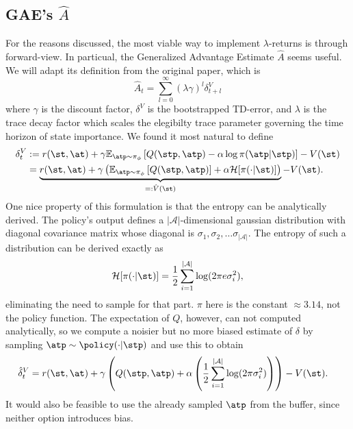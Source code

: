 \subsection{GAE's \(\hat{A}\)}
For the reasons discussed, the most viable way to implement \(\lambda\)-returns is through forward-view. In particual, the Generalized Advantage Estimate \(\hat{A}\) seems useful. We will adapt its definition from the original paper, which is
\begin{equation}
    \hat{A}_t = \sum_{l=0}^\infty {(\lambda\gamma)^l \delta_{t+l}^V}
\end{equation}
where $\gamma$ is the discount factor, $\delta^V$ is the bootstrapped TD-error, and $\lambda$ is the trace decay factor which scales the elegibilty trace parameter governing the time horizon of state importance. We found it most natural to define
\begin{align}
    \label{eq:delta_V}
    \delta_t^V &:=  r(\st, \at) + \gamma\mathbb{E}_{\atp \sim \pi_\phi} \left[Q(\stp,\atp) - \alpha \log{\pi(\atp|\stp)}\right]- V(\st) \notag\\
    &= \underbrace{r(\st, \at) + \gamma\left(
        \mathbb{E}_{\atp \sim \pi_\phi}\left[Q(\stp,\atp)\right] + \alpha \mathcal{H}[\pi(\cdot | \st)]
    \right)}_{=: \hat{V}(\st)} - V(\st).
\end{align}
One nice property of this formulation is that the entropy can be analytically derived. The policy's output defines a \(|\mathcal{A}|\)-dimensional gaussian distribution with diagonal covariance matrix whose diagonal is \(\sigma_1, \sigma_2, \ldots \sigma_{|\mathcal{A}|}\). The entropy of such a distribution can be derived exactly as
\begin{align}
    \mathcal{H}[\pi(\cdot | \st)] = \frac{1}{2} \sum_{i=1}^{|\mathcal{A}|}\log(2 \pi e \sigma_i^2), \label{eq:H}
\end{align}
eliminating the need to sample for that part. \(\pi\) here is the constant \(\approx 3.14\), not the policy function. The expectation of \(Q\), however, can not computed analytically, so we compute a noisier but no more biased estimate of \(\delta\) by sampling \(\atp \sim \policy(\cdot | \stp)\) and use this to obtain
\begin{align}
    \hat{\delta}_t^V &=  r(\st, \at) + \gamma\left(
        Q(\stp,\atp) + \alpha \left(\frac{1}{2} \sum_{i=1}^{|\mathcal{A}|}\log(2 \pi \sigma_i^2)
    \right)\right) - V(\st).
\end{align}
It would also be feasible to use the already sampled \(\atp\) from the buffer, since neither option introduces bias.

